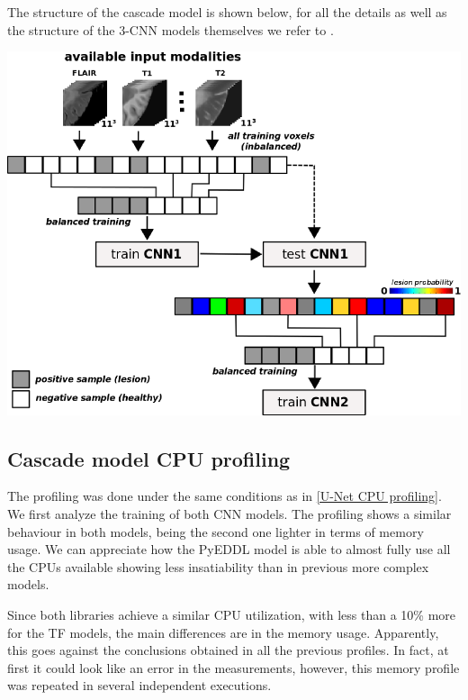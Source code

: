 The structure of the cascade model is shown below, for all the details as well as the structure of the 3-CNN models themselves we refer to \cite{VALVERDE:2017}.

\vspace{0.6cm}
\begin{center}
\includegraphics[width=\textwidth]{images/cascade_model.png}
\end{center}


\newpage
\subsection{Cascade model CPU profiling}

The profiling was done under the same conditions as in \ref{U-Net CPU profiling}. We first analyze the training of both CNN models. The profiling shows a similar behaviour in both models, being the second one lighter in terms of memory usage. We can appreciate how the PyEDDL model is able to almost fully use all the CPUs available showing less insatiability than in previous more complex models.

Since both libraries achieve a similar CPU utilization, with less than a 10\% more for the TF models, the main differences are in the memory usage. Apparently, this goes against the conclusions obtained in all the previous profiles. In fact, at first it could look like an error in the measurements, however, this memory profile was repeated in several independent executions. 

